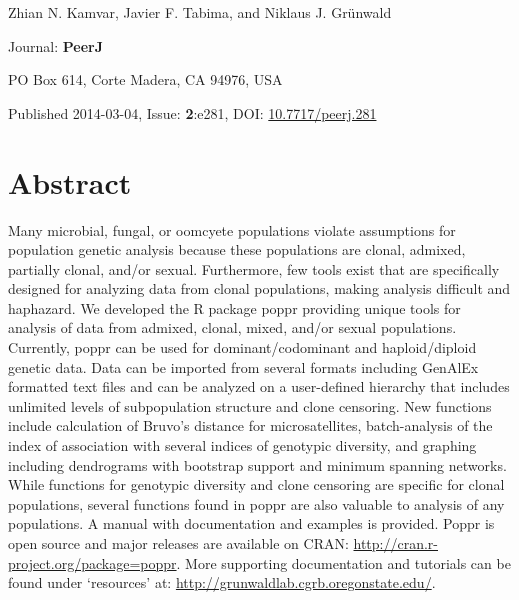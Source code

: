 \documentclass[double,11pt]{beavtex}
\begin{document}
  \singlespacing
  
  \begin{center}
  
  Zhian N. Kamvar, Javier F. Tabima, and Niklaus J. Grünwald
  
  
  
  \end{center}\vspace*{\fill}
  
  Journal: \textbf{PeerJ}
  
  PO Box 614, Corte Madera, CA 94976, USA
  
  Published 2014-03-04, Issue: \textbf{2}:e281, DOI:
  \href{https://dx.doi.org/10.7717/peerj.281}{10.7717/peerj.281}
  
  \doublespacing
  \newpage
  
  \section{Abstract}\label{abstract}
  
  Many microbial, fungal, or oomcyete populations violate assumptions for
  population genetic analysis because these populations are clonal,
  admixed, partially clonal, and/or sexual. Furthermore, few tools exist
  that are specifically designed for analyzing data from clonal
  populations, making analysis difficult and haphazard. We developed the R
  package poppr providing unique tools for analysis of data from admixed,
  clonal, mixed, and/or sexual populations. Currently, poppr can be used
  for dominant/codominant and haploid/diploid genetic data. Data can be
  imported from several formats including GenAlEx formatted text files and
  can be analyzed on a user-defined hierarchy that includes unlimited
  levels of subpopulation structure and clone censoring. New functions
  include calculation of Bruvo's distance for microsatellites,
  batch-analysis of the index of association with several indices of
  genotypic diversity, and graphing including dendrograms with bootstrap
  support and minimum spanning networks. While functions for genotypic
  diversity and clone censoring are specific for clonal populations,
  several functions found in poppr are also valuable to analysis of any
  populations. A manual with documentation and examples is provided. Poppr
  is open source and major releases are available on CRAN:
  \url{http://cran.r-project.org/package=poppr}. More supporting
  documentation and tutorials can be found under `resources' at:
  \url{http://grunwaldlab.cgrb.oregonstate.edu/}.
  
\end{document}
